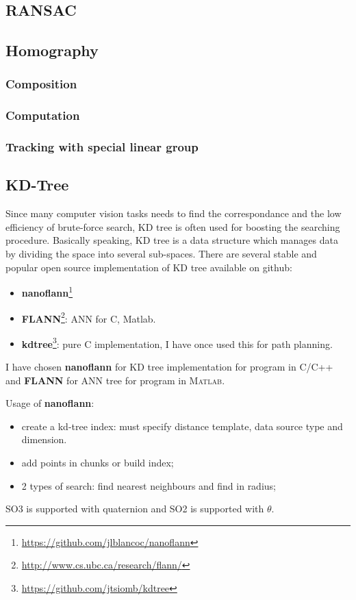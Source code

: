 \subsection{RANSAC}

\subsection{Homography}
\subsubsection{Composition}
\subsubsection{Computation}
\subsubsection{Tracking with special linear group}

\subsection{KD-Tree}
Since many computer vision tasks needs to find the correspondance and the low efficiency of brute-force search, KD tree is often used for boosting the searching procedure. Basically speaking, KD tree is a data structure which manages data by dividing the space into several sub-spaces. There are several stable and popular open source implementation of KD tree available on github:
\begin{itemize}
\item \textbf{nanoflann}\footnote{\url{https://github.com/jlblancoc/nanoflann}}
\item \textbf{FLANN}\footnote{\url{http://www.cs.ubc.ca/research/flann/}}: ANN for C, Matlab.
\item \textbf{kdtree}\footnote{\url{https://github.com/jtsiomb/kdtree}}: pure C implementation, I have once used this for path planning.
\end{itemize}
I have chosen \textbf{nanoflann} for KD tree implementation for program in \textsc{C/C++} and \textbf{FLANN} for ANN tree for program in \textsc{Matlab}.

Usage of \textbf{nanoflann}:
\begin{itemize}
\item create a kd-tree index: must specify distance template, data source type and dimension.
\item add points in chunks or build index;
\item 2 types of search: find nearest neighbours and find in radius;
\end{itemize}
SO3 is supported with quaternion and SO2 is supported with $\theta$.

